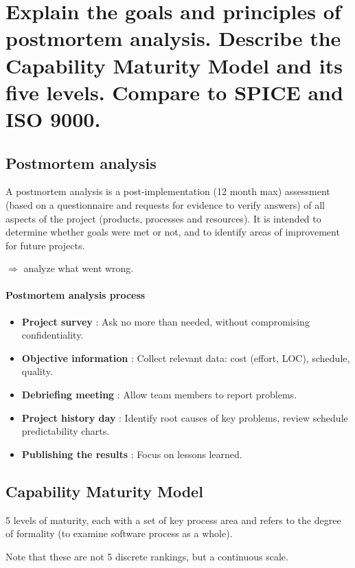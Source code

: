 \clearpage{}

\section{Explain the goals and principles of postmortem analysis. Describe
the Capability Maturity Model and its five levels. Compare to SPICE and ISO
9000.}

\subsection{Postmortem analysis}


A postmortem analysis is a post-implementation (12 month max) assessment
(based on a questionnaire and requests for evidence to verify answers) of all aspects of the
project (products, processes and resources). It is intended to determine whether
goals were met or not, and to identify areas of improvement for future projects.

$\Rightarrow$ analyze what went wrong.

\paragraph{Postmortem analysis process}

\begin{itemize}
    \item \textbf{Project survey} : Ask no more than needed, without compromising confidentiality.
    \item \textbf{Objective information} : Collect relevant data: cost (effort, LOC), schedule, quality.
    \item \textbf{Debriefing meeting} : Allow team members to report problems.
    \item \textbf{Project history day} : Identify root causes of key problems, review schedule predictability charts.
    \item \textbf{Publishing the results} : Focus on lessons learned.
\end{itemize}

\subsection{Capability Maturity Model}

5 levels of maturity, each with a set of key process area and refers to
the degree of formality (to examine software process as a whole).

Note that these are not 5 discrete rankings, but a
continuous scale.

